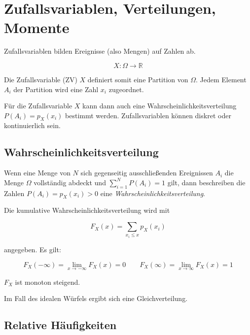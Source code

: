 \section{Zufallsvariablen, Verteilungen, Momente}
\label{sec:zufallsvariablen}

Zufallsvariablen bilden Ereignisse (also Mengen) auf Zahlen ab.

$$
X : \Omega \to \mathbb{R}
$$

Die Zufallsvariable (ZV) $X$ definiert somit eine Partition von $\Omega$. Jedem Element $A_i$ der Partition wird eine Zahl $x_i$ zugeordnet.

Für die Zufallsvariable $X$ kann dann auch eine Wahrscheinlichkeitsverteilung $P(A_i) = p_X(x_i)$ bestimmt werden. Zufallsvariablen können diskret oder kontinuierlich sein.

\subsection{Wahrscheinlichkeitsverteilung}
\label{sec:wahrscheinlichkeitsverteilung}

\begin{definition}[Wahrscheinlichkeitsverteilung]
Wenn eine Menge von $N$ sich gegenseitig ausschließenden Ereignissen $A_i$ die Menge $\Omega$ vollständig abdeckt und $\sum_{i=1}^{N} P(A_i) = 1$ gilt, dann beschreiben die Zahlen $P(A_i) = p_X(x_i) > 0$ eine \textit{Wahrscheinlichkeitsverteilung}.

Die kumulative Wahrscheinlichkeitsverteilung wird mit

$$
F_X(x) = \sum_{x_i \leq x} p_X(x_i)
$$

angegeben. Es gilt:

$$
F_X(-\infty) = \lim_{x \to -\infty} F_X(x) = 0 \qquad F_X(\infty) = \lim_{x \to \infty} F_X(x) = 1
$$

$F_X$ ist monoton steigend.
\end{definition}

\begin{beispiel}
Im Fall des idealen Würfels ergibt sich eine Gleichverteilung.

\end{beispiel}

\subsection{Relative Häufigkeiten}
\label{sec:relative-haeufigkeiten}

